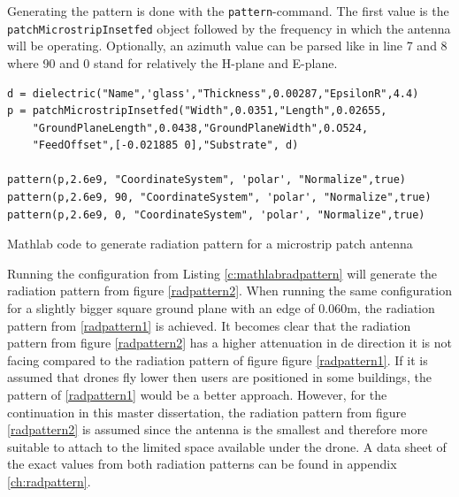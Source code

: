 Generating the pattern is done with the \verb|pattern|-command. The first value is the \verb|patchMicrostripInsetfed| object followed by the frequency
in which the antenna will be operating. Optionally, an azimuth value can be parsed like in line 7 and 8 where 90 and 0 stand for relatively the H-plane and E-plane.

\begin{listing}[h!]
\begin{verbatim}
d = dielectric("Name",'glass',"Thickness",0.00287,"EpsilonR",4.4)
p = patchMicrostripInsetfed("Width",0.0351,"Length",0.02655,
    "GroundPlaneLength",0.0438,"GroundPlaneWidth",0.O524,
    "FeedOffset",[-0.021885 0],"Substrate", d)

pattern(p,2.6e9, "CoordinateSystem", 'polar', "Normalize",true)
pattern(p,2.6e9, 90, "CoordinateSystem", 'polar', "Normalize",true)
pattern(p,2.6e9, 0, "CoordinateSystem", 'polar', "Normalize",true)
\end{verbatim}
\caption{Mathlab code to generate radiation pattern for a microstrip patch antenna}
\label{c:mathlabradpattern}
\end{listing}

Running the configuration from Listing \ref{c:mathlabradpattern} will generate the radiation pattern from figure \ref{radpattern2}.
When running the same configuration for a slightly bigger square ground plane with an edge of 0.060m, the radiation pattern from \ref{radpattern1} is
achieved. It becomes clear that the radiation pattern from figure \ref{radpattern2} has a higher attenuation in de direction it is not facing compared to
the radiation pattern of figure figure \ref{radpattern1}. If it is assumed that drones fly lower then users are positioned in some buildings, the pattern of 
\ref{radpattern1} would be a better approach. However, for the continuation in this master dissertation, the radiation pattern from figure \ref{radpattern2} 
is assumed since the antenna is the smallest
and therefore more suitable to attach to the limited space available under the drone. A data sheet of the exact values from both radiation patterns can be
found in appendix \ref{ch:radpattern}.

